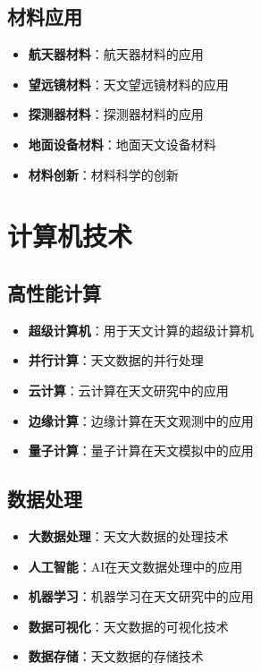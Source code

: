 \documentclass[12pt,UTF8]{ctexbook}
\begin{document}
\section{材料应用}

\begin{itemize}
  \item \textbf{航天器材料}：航天器材料的应用
  \item \textbf{望远镜材料}：天文望远镜材料的应用
  \item \textbf{探测器材料}：探测器材料的应用
  \item \textbf{地面设备材料}：地面天文设备材料
  \item \textbf{材料创新}：材料科学的创新
\end{itemize}

\chapter{计算机技术}
\section{高性能计算}

\begin{itemize}
  \item \textbf{超级计算机}：用于天文计算的超级计算机
  \item \textbf{并行计算}：天文数据的并行处理
  \item \textbf{云计算}：云计算在天文研究中的应用
  \item \textbf{边缘计算}：边缘计算在天文观测中的应用
  \item \textbf{量子计算}：量子计算在天文模拟中的应用
\end{itemize}

\section{数据处理}

\begin{itemize}
  \item \textbf{大数据处理}：天文大数据的处理技术
  \item \textbf{人工智能}：AI在天文数据处理中的应用
  \item \textbf{机器学习}：机器学习在天文研究中的应用
  \item \textbf{数据可视化}：天文数据的可视化技术
  \item \textbf{数据存储}：天文数据的存储技术
\end{itemize}
\end{document}
